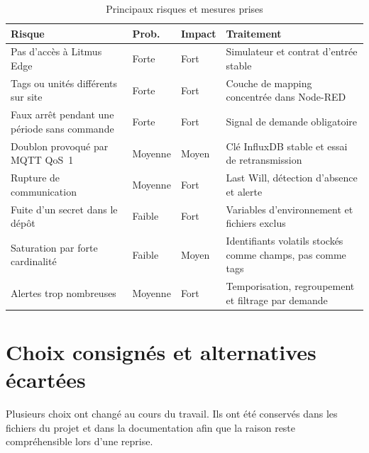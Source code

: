 \begin{table}[H]
\centering
\caption{Principaux risques et mesures prises}
\begin{tabularx}{\textwidth}{p{}p{}p{}Y}
\toprule
Risque & Prob. & Impact & Traitement \\
\midrule
Pas d'accès à Litmus Edge & Forte & Fort & Simulateur et contrat d'entrée stable \\
Tags ou unités différents sur site & Forte & Fort & Couche de mapping concentrée dans Node-RED \\
Faux arrêt pendant une période sans commande & Forte & Fort & Signal de demande obligatoire \\
Doublon provoqué par MQTT QoS~1 & Moyenne & Moyen & Clé InfluxDB stable et essai de retransmission \\
Rupture de communication & Moyenne & Fort & Last Will, détection d'absence et alerte \\
Fuite d'un secret dans le dépôt & Faible & Fort & Variables d'environnement et fichiers exclus \\
Saturation par forte cardinalité & Faible & Moyen & Identifiants volatils stockés comme champs, pas comme tags \\
Alertes trop nombreuses & Moyenne & Fort & Temporisation, regroupement et filtrage par demande \\
\bottomrule
\end{tabularx}
\end{table}

\section{Choix consignés et alternatives écartées}

Plusieurs choix ont changé au cours du travail. Ils ont été conservés dans
les fichiers du projet et dans la documentation afin que la raison reste
compréhensible lors d'une reprise.

